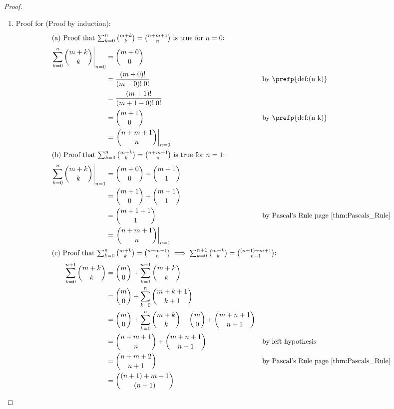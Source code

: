 \begin{proof}
\begin{enumerate}
  \item Proof for  (Proof by induction):
    \begin{align*}
    \intertext{(a) Proof that 
      $\sum_{k=0}^n {m+k \choose k} = {n+m+1 \choose n}$
      is true for $n=0$:
      }
      \left.\sum_{k=0}^n {m+k \choose k}\right|_{n=0}
        &= {m+0 \choose 0}
      \\&= \frac{(m+0)!}{(m-0)!\; 0!}
        && \text{by \prefp{def:(n k)}}
      \\&= \frac{(m+1)!}{(m+1-0)!\; 0!}
      \\&= {m+1 \choose 0}
        && \text{by \prefp{def:(n k)}}
      \\&= \left. {n+m+1 \choose n} \right|_{n=0}
    \\
    \intertext{(b) Proof that 
      $\sum_{k=0}^n {m+k \choose k} = {n+m+1 \choose n}$
      is true for $n=1$:
      }
      \left.\sum_{k=0}^n {m+k \choose k}\right|_{n=1}
        &= {m+0 \choose 0} + {m+1 \choose 1}
      \\&= {m+1 \choose 0} + {m+1 \choose 1}
      \\&= {m+1+1 \choose 1} 
        && \text{by Pascal's Rule page~\pageref{thm:Pascals_Rule}}
      \\&= \left.{n+m+1 \choose n} \right|_{n=1}
    \\
    \intertext{(c) Proof that 
      $\sum_{k=0}^n {m+k \choose k} = {n+m+1 \choose n}
       \implies
       \sum_{k=0}^{n+1} {m+k \choose k} = {(n+1)+m+1 \choose n+1}
      $:}
      \sum_{k=0}^{n+1} {m+k \choose k}
        &= {m\choose 0} + \sum_{k=1}^{n+1} {m+k \choose k}
      \\&= {m\choose 0} + \sum_{k=0}^n {m+k+1 \choose k+1}
      \\&= {m\choose 0} + \sum_{k=0}^n {m+k \choose k}
          -{m\choose 0} + {m+n+1 \choose n+1}
      \\&= {n+m+1 \choose n} + {m+n+1 \choose n+1}
        && \text{by left hypothesis}
      \\&= {n+m+2 \choose n+1}
        && \text{by Pascal's Rule page~\pageref{thm:Pascals_Rule}}
      \\&= {(n+1)+m+1 \choose (n+1)}
    \end{align*}
 

\end{enumerate}
\end{proof}
